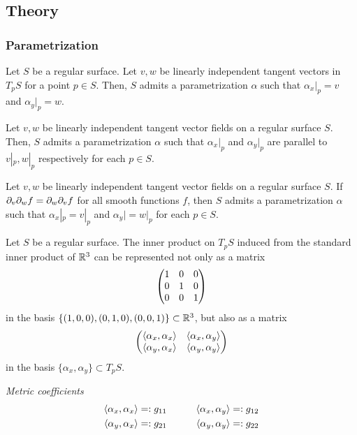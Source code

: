 \documentclass{../exp}
\def\a{\alpha}
\begin{document}
\subsection{Theory}

\subsubsection{Parametrization}



\begin{thm}
Let $S$ be a regular surface.
Let $v,w$ be linearly independent tangent vectors in $T_pS$ for a point $p\in S$.
Then, $S$ admits a parametrization $\a$ such that $\a_x|_p=v$ and $\a_y|_p=w$.
\end{thm}
\begin{thm}
Let $v,w$ be linearly independent tangent vector fields on a regular surface $S$.
Then, $S$ admits a parametrization $\a$ such that $\a_x|_p$ and $\a_y|_p$ are parallel to $v|_p,w|_p$ respectively for each $p\in S$.
\end{thm}
\begin{thm}
Let $v,w$ be linearly independent tangent vector fields on a regular surface $S$.
If $\pd_v\pd_wf=\pd_w\pd_vf$ for all smooth functions $f$, then $S$ admits a parametrization $\a$ such that $\a_x|_p=v|_p$ and $\a_y|=w|_p$ for each $p\in S$.
\end{thm}

Let $S$ be a regular surface.
The inner product on $T_pS$ induced from the standard inner product of $\mathbb{R}^3$ can be represented not only as a matrix
\[\begin{pmatrix}1&0&0\\0&1&0\\0&0&1\end{pmatrix}\]
in the basis $\{(1,0,0),(0,1,0),(0,0,1)\}\subset\mathbb{R}^3$, but also as a matrix
\[\mat{\<\a_x,\a_x\>&\<\a_x,\a_y\>\\\<\a_y,\a_x\>&\<\a_y,\a_y\>}\]
in the basis $\{\a_x,\a_y\}\subset T_pS$.

\begin{defn}
\emph{Metric coefficients}
\begin{alignat*}{2}
\<\a_x,\a_x\>&=:g_{11}&\qquad
\<\a_x,\a_y\>&=:g_{12}\\
\<\a_y,\a_x\>&=:g_{21}&
\<\a_y,\a_y\>&=:g_{22}
\end{alignat*}
\end{defn}
\end{document}

